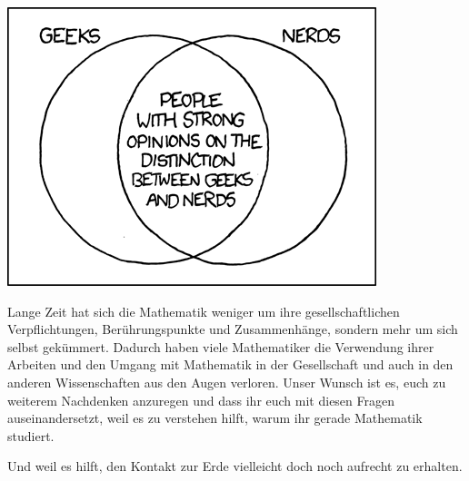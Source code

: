 \begin{center}
\includegraphics[scale=0.75]{comics/747}
\end{center}

Lange Zeit hat sich die Mathematik weniger um ihre gesellschaftlichen
Verpflichtungen, Berührungspunkte und Zusammenhänge, sondern mehr um sich
selbst gekümmert. Dadurch haben viele Mathematiker die Verwendung ihrer
Arbeiten und den Umgang mit Mathematik in der Gesellschaft und auch in den
anderen Wissenschaften aus den Augen verloren. Unser Wunsch ist es, euch zu
weiterem Nachdenken anzuregen und dass ihr euch mit diesen Fragen
auseinandersetzt, weil es zu verstehen hilft, warum ihr gerade Mathematik
studiert. 

Und weil es hilft, den Kontakt zur Erde vielleicht doch noch aufrecht zu
erhalten.

